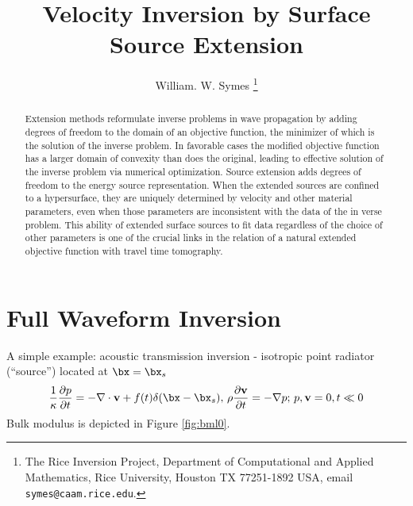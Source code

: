 \title{Velocity Inversion by Surface Source Extension}
\author{William. W. Symes \thanks{The Rice Inversion Project,
Department of Computational and Applied Mathematics, Rice University,
Houston TX 77251-1892 USA, email {\tt symes@caam.rice.edu}.}}



\maketitle
\begin{abstract}
Extension methods reformulate inverse problems in wave propagation by adding degrees of freedom to the domain of an objective function, the minimizer of which is the solution of the inverse problem. In favorable cases the modified objective function has a larger domain of convexity than does the original, leading to effective solution of the inverse problem via numerical optimization. Source extension adds degrees of freedom to the energy source representation. When the extended sources are confined to a hypersurface, they are uniquely determined by velocity and other material parameters, even when those parameters are inconsistent with the data of the in verse problem. This ability of extended surface sources to fit data regardless of the choice of other parameters is one of the crucial links in the relation of a natural extended objective function with travel time tomography.


\end{abstract}


\section{Full Waveform Inversion}

A simple example: acoustic transmission inversion - isotropic point radiator (``source'') located at  $\bx=\bx_s$
\begin{equation}
\label{eqn:awept}
\frac{1}{\kappa}\frac{\partial p}{\partial t} = -\nabla \cdot {\bf v} + f(t)\delta(\bx-\bx_s), \,\rho \frac{\partial {\bf v}}{\partial t} = - \nabla p; \,p,{\bf v}=0, t \ll 0
\end{equation}
Bulk modulus is depicted in Figure \ref{fig:bml0}.


